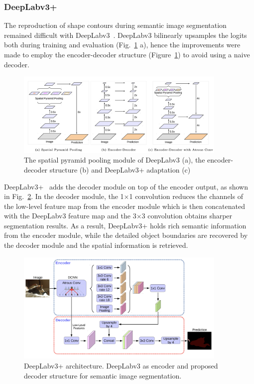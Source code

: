 \subsubsection{DeepLabv3+}
The reproduction of shape contours during semantic image segmentation remained difficult with DeepLabv3~\cite{chen2018encoder}.
DeepLabv3 bilinearly upsamples the logits both during training and evaluation (Fig.~\ref*{fig:deeplab} a), hence
the improvements were made to employ the encoder-decoder structure (Figure~\ref*{fig:deeplab}) to avoid using a naive decoder.
\begin{figure}[h] %
  \centering
  \includegraphics[width=0.9\textwidth]{figures/deeplab_encoderdecoder.png} %
  \caption{The spatial pyramid pooling module of DeepLabv3 (a), the encoder-decoder structure (b) and DeepLabv3+ adaptation (c) \cite{chen2018encoder}} %
  \label{fig:deeplab} %
\end{figure} 
DeepLabv3+~\cite{chen2018encoder} adds the decoder module on top of the encoder output, as shown in Fig.~\ref*{fig:deeplabv3plus}.
In the decoder module, the 1$\times$1 convolution reduces the channels of the
low-level feature map from the encoder module which is then concatenated with the
DeepLabv3 feature map and the 3$\times$3 convolution obtains sharper segmentation results.
As a result, DeepLabv3+ holds rich semantic information from the encoder module,
while the detailed object boundaries are recovered by the decoder module and the spatial information is retrieved.
\begin{figure}[h] %
  \centering
  \includegraphics[width=0.9\textwidth]{figures/deeplabv3plus.png} %
  \caption{DeepLabv3+ architecture. DeepLabv3 as encoder and proposed decoder structure for semantic image segmentation. \cite{chen2018encoder}} %
  \label{fig:deeplabv3plus} %
\end{figure} 

